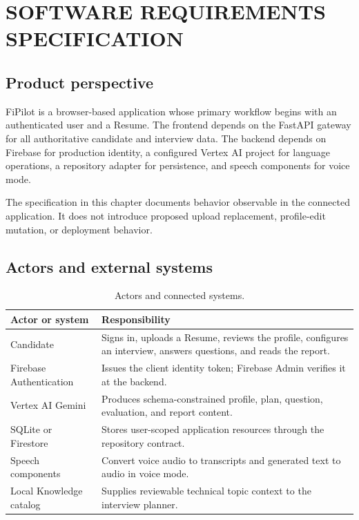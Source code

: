\chapter{SOFTWARE REQUIREMENTS SPECIFICATION}\label{ch:requirements}

\section{Product perspective}

FiPilot is a browser-based application whose primary workflow begins with an authenticated user and a Resume. The frontend depends on the FastAPI gateway for all authoritative candidate and interview data. The backend depends on Firebase for production identity, a configured Vertex AI project for language operations, a repository adapter for persistence, and speech components for voice mode.

The specification in this chapter documents behavior observable in the connected application. It does not introduce proposed upload replacement, profile-edit mutation, or deployment behavior.

\section{Actors and external systems}

\begin{table}[htbp]\centering
\caption{Actors and connected systems.}\label{tab:actors}
\begin{tabularx}{\textwidth}{p{}Y}\toprule
Actor or system & Responsibility\\ \midrule
Candidate & Signs in, uploads a Resume, reviews the profile, configures an interview, answers questions, and reads the report.\\
Firebase Authentication & Issues the client identity token; Firebase Admin verifies it at the backend.\\
Vertex AI Gemini & Produces schema-constrained profile, plan, question, evaluation, and report content.\\
SQLite or Firestore & Stores user-scoped application resources through the repository contract.\\
Speech components & Convert voice audio to transcripts and generated text to audio in voice mode.\\
Local Knowledge catalog & Supplies reviewable technical topic context to the interview planner.\\
\bottomrule\end{tabularx}
\end{table}


